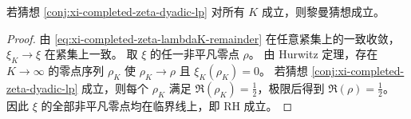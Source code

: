 \begin{theorem}\label{thm:xi-completed-zeta-dyadic-lp-implies-rh}
若猜想 \ref{conj:xi-completed-zeta-dyadic-lp} 对所有 \(K\) 成立，则黎曼猜想成立。
\end{theorem}
\begin{proof}
由 \eqref{eq:xi-completed-zeta-lambdaK-remainder} 在任意紧集上的一致收敛，\(\xi_K\to\xi\) 在紧集上一致。
取 \(\xi\) 的任一非平凡零点 \(\rho\)。
由 Hurwitz 定理，存在 \(K\to\infty\) 的零点序列 \(\rho_K\) 使 \(\rho_K\to\rho\) 且 \(\xi_K(\rho_K)=0\)。
若猜想 \ref{conj:xi-completed-zeta-dyadic-lp} 成立，则每个 \(\rho_K\) 满足 \(\Re(\rho_K)=\frac12\)，极限后得到 \(\Re(\rho)=\frac12\)。
因此 \(\xi\) 的全部非平凡零点均在临界线上，即 RH 成立。
\end{proof}

\endinput
